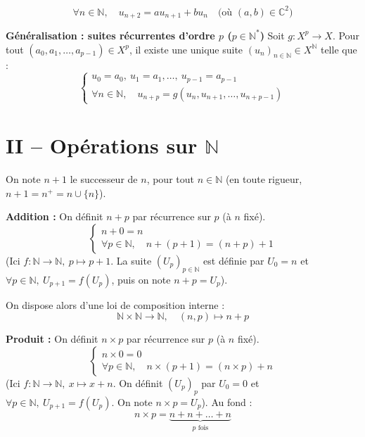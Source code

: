 \documentclass[a4paper,11pt]{article}
\newcommand{\C}{\mathbb{C}}
\newcommand{\N}{\mathbb{N}}
\begin{document}
\begin{exemples}
\[
\forall n \in \N, \quad u_{n+2} = a u_{n+1} + b u_n \quad \text{(où } (a, b) \in \C^2\text{)}
\]
\end{exemples}

\textbf{Généralisation : suites récurrentes d'ordre $p$ ($p \in \N^*$)}
Soit $g : X^p \to X$.
Pour tout $(a_0, a_1, \dots, a_{p-1}) \in X^p$, il existe une unique suite $(u_n)_{n \in \N} \in X^{\N}$ telle que :
\[
\begin{cases}
u_0 = a_0, \ u_1 = a_1, \dots, \ u_{p-1} = a_{p-1} \\
\forall n \in \N, \quad u_{n+p} = g(u_n, u_{n+1}, \dots, u_{n+p-1})
\end{cases}
\]

\section{II -- Opérations sur $\N$}

On note $n+1$ le successeur de $n$, pour tout $n \in \N$ (en toute rigueur, $n+1 = n^+ = n \cup \{n\}$).

\textbf{Addition :}
On définit $n+p$ par récurrence sur $p$ (à $n$ fixé).
\[
\begin{cases}
n + 0 = n \\
\forall p \in \N, \quad n + (p+1) = (n+p) + 1
\end{cases}
\]
(Ici $f : \N \to \N, \ p \mapsto p+1$. La suite $(U_p)_{p \in \N}$ est définie par $U_0 = n$ et $\forall p \in \N, \ U_{p+1} = f(U_p)$, puis on note $n+p = U_p$).

On dispose alors d'une loi de composition interne :
\[
\N \times \N \longrightarrow \N, \quad (n, p) \longmapsto n+p
\]

\textbf{Produit :}
On définit $n \times p$ par récurrence sur $p$ (à $n$ fixé).
\[
\begin{cases}
n \times 0 = 0 \\
\forall p \in \N, \quad n \times (p+1) = (n \times p) + n
\end{cases}
\]
(Ici $f : \N \to \N, \ x \mapsto x+n$. On définit $(U_p)_p$ par $U_0 = 0$ et $\forall p \in \N, \ U_{p+1} = f(U_p)$. On note $n \times p = U_p$).
Au fond :
\[
n \times p = \underbrace{n + n + \dots + n}_{p \text{ fois}}
\]
\end{document}
